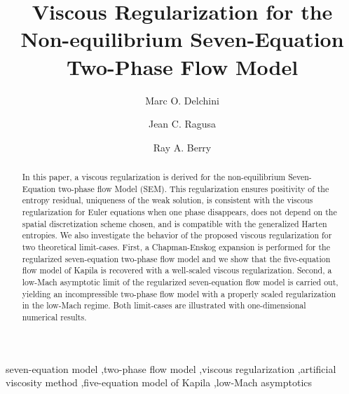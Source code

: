 \documentclass[preprint,10pt]{elsarticle}
\begin{document}
\begin{frontmatter}
\title{Viscous Regularization for the Non-equilibrium Seven-Equation Two-Phase Flow Model}
\author{Marc O. Delchini}
%
\author{Jean C. Ragusa}
%
\author{Ray A. Berry}
%
\address[label1]{Department of Nuclear Engineering, Texas A\&M University, College Station, TX 77843, USA }
%
\address[label2]{Idaho National Laboratory, Idaho Falls, ID 83415, USA }
%
\begin{abstract}
In this paper, a viscous regularization is derived for the non-equilibrium Seven-Equation two-phase flow Model (SEM). This regularization ensures positivity of the entropy 
residual, uniqueness of the weak solution, is consistent with the viscous regularization for Euler equations when one phase disappears, does not depend on the spatial discretization scheme 
chosen, and is compatible with the generalized Harten entropies. We also investigate the behavior of the proposed viscous regularization for two 
theoretical limit-cases. First, a Chapman-Enskog expansion is performed for the regularized seven-equation two-phase flow model and we show that the five-equation flow 
model of Kapila is recovered with a well-scaled viscous regularization. Second, a low-Mach asymptotic limit of the regularized seven-equation flow model is carried out, 
yielding an incompressible two-phase flow model with a properly scaled regularization in the low-Mach regime. Both limit-cases are illustrated with one-dimensional numerical results.
\end{abstract}
\begin{keyword}
seven-equation model \sep two-phase flow model \sep viscous regularization \sep artificial viscosity method \sep five-equation model of Kapila \sep low-Mach asymptotics 
\end{keyword}
\end{frontmatter}
%
\linenumbers
%
\end{document}
